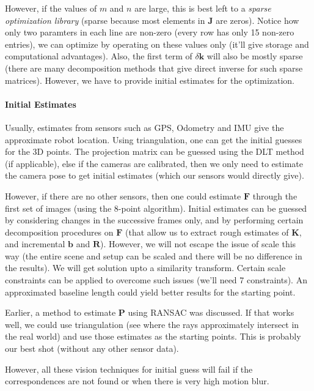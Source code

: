 However, if the values of $m$ and $n$ are large, this is best left to a \emph{sparse optimization library} (sparse because most elements in $\mathbf{J}$ are zeros). Notice how only two paramters in each line are non-zero (every row has only 15 non-zero entries), we can optimize by operating on these values only (it'll give storage and computational advantages). Also, the first term of $\delta \mathbf{k}$ will also be mostly sparse (there are many decomposition methods that give direct inverse for such sparse matrices). However, we have to provide initial estimates for the optimization.

\paragraph*{Initial Estimates}

Usually, estimates from sensors such as GPS, Odometry and IMU give the approximate robot location. Using triangulation, one can get the initial guesses for the 3D points. The projection matrix can be guessed using the DLT method (if applicable), else if the cameras are calibrated, then we only need to estimate the camera pose to get initial estimates (which our sensors would directly give).

However, if there are no other sensors, then one could estimate $\mathbf{F}$ through the first set of images (using the 8-point algorithm). Initial estimates can be guessed by considering changes in the successive frames only, and by performing certain decomposition procedures on $\mathbf{F}$ (that allow us to extract rough estimates of $\mathbf{K}$, and incremental $\mathbf{b}$ and $\mathbf{R}$). However, we will not escape the issue of scale this way (the entire scene and setup can be scaled and there will be no difference in the results). We will get solution upto a similarity transform. Certain scale constraints can be applied to overcome such issues (we'll need 7 constraints). An approximated baseline length could yield better results for the starting point.

Earlier, a method to estimate $\mathbf{P}$ using RANSAC was discussed. If that works well, we could use triangulation (see where the rays approximately intersect in the real world) and use those estimates as the starting points. This is probably our best shot (without any other sensor data).

However, all these vision techniques for initial guess will fail if the correspondences are not found or when there is very high motion blur.
